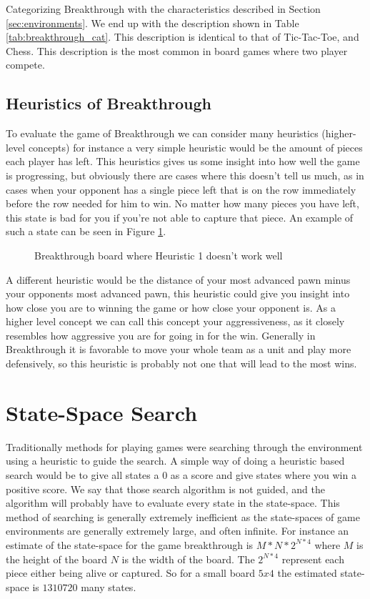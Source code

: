 Categorizing Breakthrough with the characteristics described in Section \ref{sec:environments}. We end up with the description 
shown in Table \ref{tab:breakthrough_cat}. This description is identical to that of Tic-Tac-Toe, and Chess.
This description is the most common in board games where two player compete. 

\subsection{Heuristics of Breakthrough}

To evaluate the game of Breakthrough we can consider many heuristics (higher-level concepts) for instance 
a very simple heuristic would be the amount of pieces each player has left. This heuristics gives us some 
insight into how well the game is progressing, but obviously there are cases where this doesn't tell us 
much, as in cases when your opponent has a single piece left that is on the row immediately before the 
row needed for him to win. No matter how many pieces you have left, this state is bad for you if you're not 
able to capture that piece. An example of such a state can be seen in Figure \ref{fig:bt_h1_bad}.

\begin{figure}[]
  \centering
  \caption{Breakthrough board where Heuristic 1 doesn't work well}
  \label{fig:bt_h1_bad}
\end{figure}


A different heuristic would be the distance of your most advanced pawn minus your opponents most 
advanced pawn, this heuristic could give you insight into how close you are to winning the game or 
how close your opponent is. As a higher level concept we can call this concept your aggressiveness, 
as it closely resembles how aggressive you are for going in for the win. Generally in Breakthrough 
it is favorable to move your whole team as a unit and play more defensively, so this heuristic 
is probably not one that will lead to the most wins.

\section{State-Space Search}

Traditionally methods for playing games were searching through the environment using a heuristic to
guide the search. A simple way of doing a heuristic based search would be to give all states a $0$ 
as a score and give states where you win a positive score. We say that those search algorithm 
is not guided, and the algorithm will probably have to evaluate every state in the state-space. 
This method of searching is generally extremely inefficient as the state-spaces of game environments 
are generally extremely large, and often infinite. For instance an estimate of the state-space 
for the game breakthrough is $M * N * 2^{N*4}$ where $M$ is the height of the board $N$ is the width 
of the board. The $2^{N*4}$ represent each piece either being alive or captured. So for a small board
$5x4$ the estimated state-space is $1310720$ many states.

